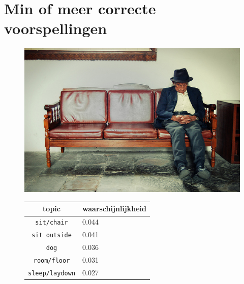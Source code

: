 \section{Min of meer correcte voorspellingen}
\begin{figure}[!htb]
    \centering
    \begin{minipage}[t]{.5\linewidth}
    \centering
    \vspace{0pt}
    \includegraphics[width=\textwidth]{Images/LDA/4862204000.jpg}
    \end{minipage}\hfill
    \begin{minipage}[t]{.5\textwidth}
    \centering
    \vspace{0pt}
    \begin{tabular}{cl}
            topic                           & waarschijnlijkheid\\
            \hline
            \texttt{sit/chair}             & 0.044 \\
            \texttt{sit outside}                   & 0.041 \\
            \texttt{dog}                 & 0.036 \\
            \texttt{room/floor}           & 0.031 \\
            \texttt{sleep/laydown}        & 0.027\\
            \hline
        \end{tabular}
    \end{minipage}
\end{figure}

